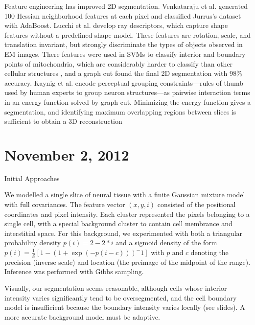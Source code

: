 \documentclass[draft,english]{article}
\newcommand{\+}[1]{\ensuremath{\boldsymbol{\mathrm{#1}}}}
\begin{document}
Feature engineering has improved 2D segmentation. Venkataraju et al. \cite{Venkataraju2009} generated 100 Hessian neighborhood features at each pixel and classified Jurrus's dataset with AdaBoost. Lucchi et al. \cite{Lucchi2010} develop ray descriptors, which capture shape features without a predefined shape model. These features are rotation, scale, and translation invariant, but strongly discriminate the types of objects observed in EM images. There features were used in SVMs to classify interior and boundary points of mitochondria, which are considerably harder to classify than other cellular structures \cite{Kaynig2010b}, and a graph cut found the final 2D segmentation with 98\% accuracy. Kaynig et al. encode perceptual grouping constraints---rules of thumb used by human experts to group neuron structures---as pairwise interaction terms in an energy function solved by graph cut. Minimizing the energy function gives a segmentation, and identifying maximum overlapping regions between slices is sufficient to obtain a 3D reconstruction 

\section{November 2, 2012}
Initial Approaches

We modelled a single slice of neural tissue with a finite Gaussian mixture model with full covariances. The feature vector $(x, y, i)$ consisted of the positional coordinates and pixel intensity. Each cluster represented the pixels belonging to a single cell, with a special background cluster to contain cell membrance and interstitial space. For this background, we experimented with both a triangular probability density $p(i) = 2 - 2*i$ and a sigmoid density of the form $p(i) = \frac{1}{Z} \left[ 1 - \left( 1 + \exp(-p(i-c)) \right)^-1 \right]$ with $p$ and $c$ denoting the precision (inverse scale) and location (the preimage of the midpoint of the range). Inference was performed with Gibbs sampling.

Visually, our segmentation seems reasonable, although cells whose interior intensity varies significantly tend to be oversegmented, and the cell boundary model is insufficient because the boundary intensity varies locally (see slides). A more accurate background model must be adaptive.
\end{document}
